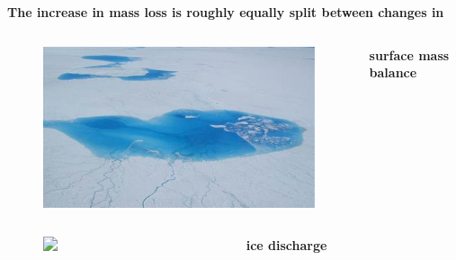 \documentclass[hide notes,intlimits]{beamer}
\begin{document}
  {
} 

\begin{frame}[plain]
  \textbf{The increase in mass loss is roughly equally split between changes in}
    \begin{columns}[c]
      \begin{column}{.28\linewidth}
        \begin{figure}
          \includegraphics[width=\linewidth]{gris-melt-ponds}
        \end{figure}
      \end{column}
      \begin{column}{.67\linewidth}
        \textbf{surface mass balance}
      \end{column}
    \end{columns}
    \begin{columns}[c]
      \begin{column}{.28\linewidth}
        \begin{figure}
          \includegraphics<1>[width=\linewidth]{storeglacier}
        \end{figure}
      \end{column}
      \begin{column}{.67\linewidth}
        \textbf{ice discharge}
      \end{column}
    \end{columns}

\end{frame}
\end{document}
